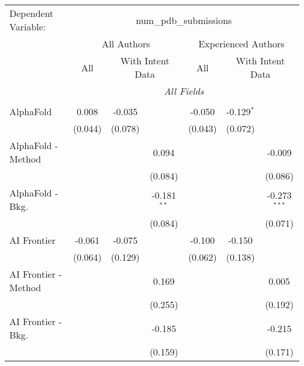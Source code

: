 \begingroup
\centering
\begin{tabular}{lcccccc}
   \tabularnewline \midrule \midrule
   Dependent Variable: & \multicolumn{6}{c}{num\_pdb\_submissions}\\
 & \multicolumn{3}{c}{All Authors} & \multicolumn{3}{c}{Experienced Authors} \\
\cmidrule(lr){2-4} \cmidrule(lr){5-7}
 & \multicolumn{1}{c}{All} & \multicolumn{2}{c}{With Intent Data} & \multicolumn{1}{c}{All} & \multicolumn{2}{c}{With Intent Data} \\
\cmidrule(lr){2-2} \cmidrule(lr){3-4} \cmidrule(lr){5-5} \cmidrule(lr){6-7}
 & \multicolumn{6}{c}{\textit{All Fields}} \\ \\
   AlphaFold            & 0.008          & -0.035         &                & -0.050         & -0.129$^{*}$  &   \\   
                        & (0.044)        & (0.078)        &                & (0.043)        & (0.072)       &   \\   
   AlphaFold - Method   &                &                & 0.094          &                &               & -0.009\\   
                        &                &                & (0.084)        &                &               & (0.086)\\   
   AlphaFold - Bkg.     &                &                & -0.181$^{**}$  &                &               & -0.273$^{***}$\\   
                        &                &                & (0.084)        &                &               & (0.071)\\   
   AI Frontier          & -0.061         & -0.075         &                & -0.100         & -0.150        &   \\   
                        & (0.064)        & (0.129)        &                & (0.062)        & (0.138)       &   \\   
   AI Frontier - Method &                &                & 0.169          &                &               & 0.005\\   
                        &                &                & (0.255)        &                &               & (0.192)\\   
   AI Frontier - Bkg.   &                &                & -0.185         &                &               & -0.215\\   
                        &                &                & (0.159)        &                &               & (0.171)\\   

\end{tabular}
